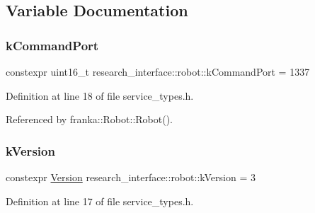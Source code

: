 \subsection{Variable Documentation}
\mbox{\label{namespaceresearch__interface_1_1robot_a7485024e26d10cbc7ad99a2f76091274}} 
\subsubsection{\texorpdfstring{k\+Command\+Port}{kCommandPort}}
{\footnotesize\ttfamily constexpr uint16\+\_\+t research\+\_\+interface\+::robot\+::k\+Command\+Port = 1337}



Definition at line 18 of file service\+\_\+types.\+h.



Referenced by franka\+::\+Robot\+::\+Robot().

\mbox{\label{namespaceresearch__interface_1_1robot_ab5e6cd0268270dc6e0adea0eb333b5df}} 
\subsubsection{\texorpdfstring{k\+Version}{kVersion}}
{\footnotesize\ttfamily constexpr \hyperlink{namespaceresearch__interface_1_1robot_aa7a53d2c58ee4f7aa706b905ddcc7d47}{Version} research\+\_\+interface\+::robot\+::k\+Version = 3}



Definition at line 17 of file service\+\_\+types.\+h.

